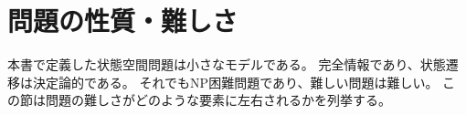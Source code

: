 


\section{問題の性質・難しさ}
\label{sec:difficulity}

本書で定義した状態空間問題は小さなモデルである。
完全情報であり、状態遷移は決定論的である。
それでもNP困難問題であり、難しい問題は難しい。
この節は問題の難しさがどのような要素に左右されるかを列挙する。

